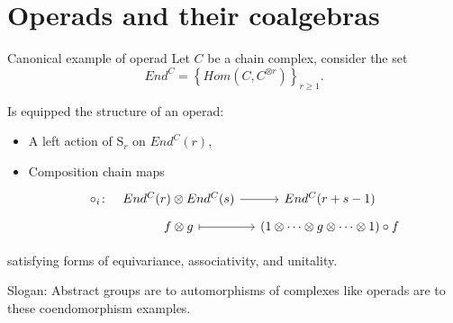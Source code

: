 \documentclass[10pt,t]{beamer} %
\renewcommand{\S}{\mathrm{S}}
\begin{document}
\section{Operads and their coalgebras}

\begin{frame}[fragile]{Canonical example of operad}
	Let $C$ be a chain complex, consider the set
	\begin{equation*}
	End^C = \left\{Hom(C, C^{\otimes r})\right\}_{r \geq 1}.
	\end{equation*}
	
	\pause
	
	Is equipped the structure of an operad:
	\begin{itemize}
		\item A left action of $\S_r$ on $End^C(r)$,
		\item Composition chain maps
		\begin{equation*}
		\begin{tikzcd}[column sep=small, row sep=tiny]
		\circ_i \colon &[-10pt] End^C(r) \otimes End^C(s) \arrow[r] & End^C(r+s-1) \\
		& f \otimes g \arrow[r, |->] & (1 \otimes \cdots \otimes g \otimes \cdots \otimes 1) \circ f 
		\end{tikzcd}
		\end{equation*}
	\end{itemize}
	satisfying forms of equivariance, associativity, and unitality.
	
	\pause \vspace*{10pt}
	
	\textcolor{pblue}{Slogan:} Abstract groups are to automorphisms of complexes like operads are to these coendomorphism examples.
\end{frame}
\end{document}
